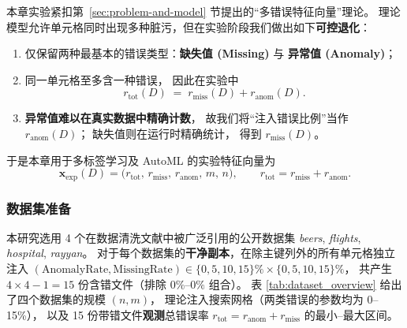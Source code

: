 \documentclass[10pt]{article} %
\numberwithin{equation}{section}
\begin{document}
\textcolor[rgb]{0.00,0.07,1.00}{本章实验紧扣第~\ref{sec:problem-and-model} 节提出的“多错误特征向量”理论。
理论模型允许单元格同时出现多种脏污，但在实验阶段我们做出如下\textbf{可控退化}：}

\begin{enumerate}[label=\arabic*), leftmargin=2em]
\item \textcolor[rgb]{0.00,0.07,1.00}{仅保留两种最基本的错误类型：\textbf{缺失值 (Missing)} 与
      \textbf{异常值 (Anomaly)}；}  

\item \textcolor[rgb]{0.00,0.07,1.00}{同一单元格至多含一种错误，
      因此在实验中
      \[
          r_{\text{tot}}(D)\;=\;
          r_{\text{miss}}(D)+r_{\text{anom}}(D).
      \]}
\vspace{-2em}
\item \textcolor[rgb]{0.00,0.07,1.00}{\textbf{异常值难以在真实数据中精确计数}，
      故我们将“注入错误比例”当作
      $r_{\text{anom}}(D)$；  
      缺失值则在运行时精确统计，
      得到 $r_{\text{miss}}(D)$。}  
\end{enumerate}

\textcolor[rgb]{0.00,0.07,1.00}{于是本章用于多标签学习及 AutoML 的实验特征向量为  
\[
  \mathbf{x}_{\text{exp}}(D)=
  \bigl(
      r_{\text{tot}},\,
      r_{\text{miss}},\,
      r_{\text{anom}},\,
      m,\,n
  \bigr),\qquad
  r_{\text{tot}}=r_{\text{miss}}+r_{\text{anom}}.
\]}

\vspace{-3em}

\subsubsection{数据集准备}\label{sec:dataset_prep}

\textcolor[rgb]{0.00,0.07,1.00}{本研究选用 4 个在数据清洗文献中被广泛引用的公开数据集
\emph{beers}, \emph{flights}, \emph{hospital}, \emph{rayyan}。
对于每个数据集的\textbf{干净副本}，在除主键列外的所有单元格独立注入
\((\text{AnomalyRate},\text{MissingRate})\in\{0,5,10,15\}\%\times\{0,5,10,15\}\%\)，
共产生 \(4\times4-1=15\) 份含错文件（排除 \(0\%–0\%\) 组合）。
表 \ref{tab:dataset_overview} 给出了四个数据集的规模 \((n,m)\)，
理论注入搜索网格（两类错误的参数均为 0–15\%），
以及 15 份带错文件\textbf{观测}总错误率
\(r_{\text{tot}}=r_{\text{anom}}+r_{\text{miss}}\) 的最小–最大区间。}
\end{document}
